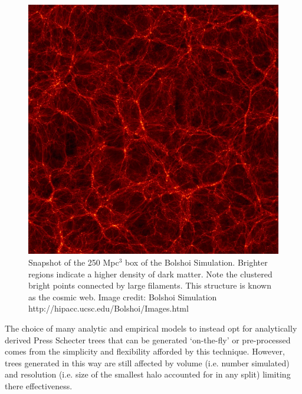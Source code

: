 \begin{figure}[h]
    \centering
    \includegraphics[width = \linewidth]{Figures/Chapter2/Bolshoi.jpg}
    \caption{Snapshot of the 250 Mpc$^3$ box of the Bolshoi Simulation. Brighter regions indicate a higher density of dark matter. Note the clustered bright points connected by large filaments. This structure is known as the cosmic web.
    Image credit: Bolshoi Simulation http://hipacc.ucsc.edu/Bolshoi/Images.html}
    \label{fig:Bolshoi}
\end{figure}

The choice of many analytic and empirical models to instead opt for analytically derived Press Schecter trees that can be generated `on-the-fly' or pre-processed comes from the simplicity and flexibility afforded by this technique. However, trees generated in this way are still affected by volume (i.e. number simulated) and resolution (i.e. size of the smallest halo accounted for in any split) limiting there effectiveness.

